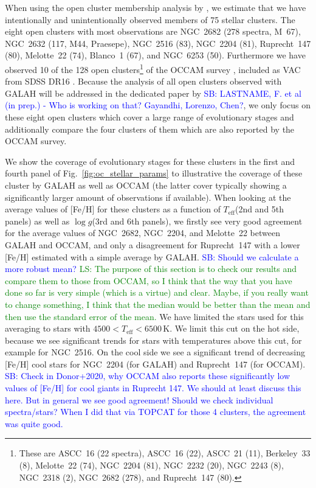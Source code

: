 \documentclass[fleqn,usenatbib,useAMS]{mnras}
\newcommand{\Teff}{$T_\mathrm{eff}$\xspace}
\newcommand{\logg}{$\log g$\xspace}
\newcommand\SB[1]{\textcolor{blue}{SB: #1}}
\newcommand\LS[1]{\textcolor{green}{LS: #1}}
\begin{document}
When using the open cluster membership analysis by \citet{CantatGaudin2020}, we estimate that we have intentionally and unintentionally observed members of 75 stellar clusters. The eight open clusters with most observations are NGC~2682 (278 spectra, M~67), NGC~2632 (117, M44, Praesepe), NGC~2516 (83), NGC~2204 (81), Ruprecht~147 (80), Melotte~22 (74), Blanco~1 (67), and NGC~6253 (50). Furthermore we have observed 10 of the 128 open clusters\footnote{These are ASCC~16 (22 spectra), ASCC~16 (22), ASCC~21 (11), Berkeley~33 (8), Melotte~22 (74), NGC~2204 (81), NGC~2232 (20), NGC~2243 (8), NGC~2318 (2), NGC~2682 (278), and Ruprecht~147 (80).} of the OCCAM survey \citep{Donor2020}, included as VAC from SDSS DR16 \citep{SDSSDR16}. Because the analysis of all open clusters observed with GALAH will be addressed in the dedicated paper by \SB{LASTNAME, F. et al (in prep.) - Who is working on that? Gayandhi, Lorenzo, Chen?}, we only focus on these eight open clusters which cover a large range of evolutionary stages and additionally compare the four clusters of them which are also reported by the OCCAM survey.

We show the coverage of evolutionary stages for these clusters in the first and fourth panel of Fig.~\ref{fig:oc_stellar_params} to illustrative the coverage of these cluster by GALAH as well as OCCAM (the latter cover typically showing a significantly larger amount of observations if available). When looking at the average values of [Fe/H] for these clusters as a function of \Teff (2nd and 5th panels) as well as \logg (3rd and 6th panels), we firstly see very good agreement for the average values of NGC~2682, NGC~2204, and Melotte~22 between GALAH and OCCAM, and only a disagreement for Ruprecht~147 with a lower [Fe/H] estimated with a simple average by GALAH. \SB{Should we calculate a more robust mean?} \LS{The purpose of this section is to check our results and compare them to those from OCCAM, so I think that the way that you have done so far is very simple (which is a virtue) and clear. Maybe, if you really want to change something, I think that the median would be better than the mean and then use the standard error of the mean.} We have limited the stars used for this averaging to stars with $4500 < T_\mathrm{eff} < 6500\,\mathrm{K}$. We limit this cut on the hot side, because we see significant trends for stars with temperatures above this cut, for example for NGC~2516. On the cool side we see a significant trend of decreasing [Fe/H] cool stars for NGC~2204 (for GALAH) and Ruprecht~147 (for OCCAM). \SB{Check in Donor+2020, why OCCAM also reports these significantly low values of [Fe/H] for cool giants in Ruprecht 147. We should at least discuss this here. But in general we see good agreement! Should we check individual spectra/stars? When I did that via TOPCAT for those 4 clusters, the agreement was quite good.}
\end{document}
